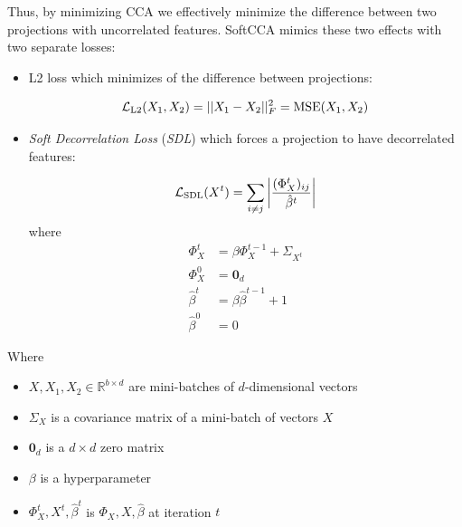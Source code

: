 Thus, by minimizing CCA we effectively minimize the difference between two
projections with uncorrelated features. SoftCCA mimics these two effects with
two separate losses:

\begin{itemize}

  \item L2 loss which minimizes of the difference between projections:

    \begin{equation}
      \mathcal{L}_{\text{L2}}(X_1, X_2) = ||X_1 - X_2||^2_F = \operatorname*{MSE}(X_1, X_2)
    \end{equation}

  \item \emph{Soft Decorrelation Loss} (\emph{SDL}) which forces a projection
    to have decorrelated features:

    \begin{equation}
      \mathcal{L}_{\text{SDL}}(X^t) = \sum_{i \ne j} \left|
          \frac{(\Phi^t_X)_{ij}}{\hat{\beta}^t}
          \right|
    \end{equation}
    where
    \begin{align}
      \Phi^t_X &= \beta \Phi^{t-1}_X + \Sigma_{X^t} \\
      \Phi^0_X &= \bm{0}_d \\
      \hat{\beta}^t &= \beta \hat{\beta}^{t-1} + 1 \\
      \hat{\beta}^0 &= 0
    \end{align}

\end{itemize}

Where

\begin{itemize}

  \item $X, X_1, X_2 \in \mathbb{R}^{b \times d}$ are mini-batches of
    $d$-dimensional vectors

  \item $\Sigma_{X}$ is a covariance matrix of a mini-batch of vectors $X$

  \item $\bm{0}_d$ is a $d \times d$ zero matrix

  \item $\beta$ is a hyperparameter

  \item $\Phi_X^t, X^t, \hat{\beta}^t$ is $\Phi_X, X, \hat{\beta}$ at iteration
    $t$

\end{itemize}

